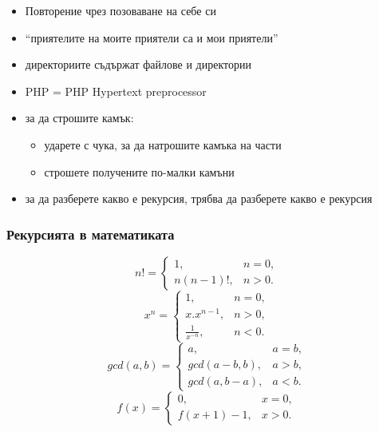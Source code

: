 \documentclass[alsotrans]{beamerswitch}
\begin{document}
\begin{frame}
\begin{center}
{{      }}
  \end{center}
  \begin{itemize}[<+(3)->]
  \item Повторение чрез позоваване на себе си
  \item ``приятелите на моите приятели са и мои приятели''
  \item директориите съдържат файлове и директории
  \item PHP = PHP Hypertext preprocessor
  \item за да строшите камък:
    \begin{itemize}
    \item ударете с чука, за да натрошите камъка на части
    \item строшете получените по-малки камъни
    \end{itemize}
  \item за да разберете какво е рекурсия, трябва да разберете какво е рекурсия
  \end{itemize}
\end{frame}

\begin{frame}
  \frametitle{Рекурсията в математиката}

  \begin{equation*}
    n! =
    \begin{cases}
      1,& n = 0,\\
      n(n-1)!,&n > 0.
    \end{cases}
  \end{equation*}
  \pause
  \begin{equation*}
    x^n =
    \begin{cases}
      1,&n = 0,\\
      x.x^{n-1},&n > 0,\\
      \frac1{x^{-n}},&n<0.
    \end{cases}
  \end{equation*}
  \pause
  \begin{equation*}
    gcd(a,b)=
    \begin{cases}
      a,&a = b,\\
      gcd(a-b,b),&a>b,\\
      gcd(a,b-a),&a<b.
    \end{cases}
  \end{equation*}
  \pause
  \begin{equation*}
    f(x)=
    \begin{cases}
      0,&x = 0,\\
      f(x+1)-1,&x>0.
    \end{cases}
  \end{equation*}
\end{frame}
\end{document}
